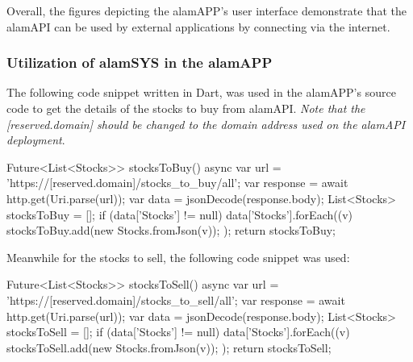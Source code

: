 Overall, the figures depicting the alamAPP's user interface 
demonstrate that the alamAPI can be used by external applications 
by connecting via the internet.

\subsubsection{Utilization of alamSYS in the alamAPP}
\label{subsubsec:utilization_alamSYS-alamAPP}
The following code snippet written in Dart, was used in the alamAPP's source 
code to get the details of the stocks to buy from alamAPI.
\textit{Note that the [reserved.domain] should be changed to
the domain address used on the alamAPI deployment}.
\hfill \\
\begin{python}
    Future<List<Stocks>> stocksToBuy() async {
        var url = 'https://[reserved.domain]/stocks_to_buy/all';
        var response = await http.get(Uri.parse(url));
        var data = jsonDecode(response.body);
        List<Stocks> stocksToBuy = [];
        if (data['Stocks'] != null) {
        data['Stocks'].forEach((v) {
            stocksToBuy.add(new Stocks.fromJson(v));
          });
        }
        return stocksToBuy;
    }
\end{python}

Meanwhile for the stocks to sell, the following code
snippet was used:
\hfill \\
\begin{python}
Future<List<Stocks>> stocksToSell() async {
      var url = 'https://[reserved.domain]/stocks_to_sell/all';
      var response = await http.get(Uri.parse(url));
      var data = jsonDecode(response.body);
      List<Stocks> stocksToSell = [];
      if (data['Stocks'] != null) {
        data['Stocks'].forEach((v) {
          stocksToSell.add(new Stocks.fromJson(v));
        });
      }
      return stocksToSell;
    }
\end{python}
